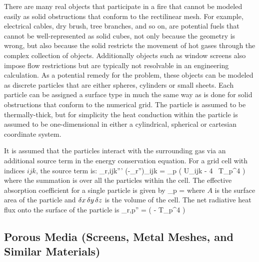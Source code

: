 There are many real objects that participate in a fire that cannot be modeled easily as solid obstructions that conform
to the rectilinear mesh. For example, electrical cables, dry brush, tree branches, and so on, are potential fuels that cannot
be well-represented as solid cubes, not only because the geometry is wrong, but also because the solid restricts the
movement of hot gases through the complex collection of objects.  Additionally objects such as window screens also impose flow restrictions but are typically not resolvable in an engineering calculation. As a potential remedy for the problem, these objects can
be modeled as discrete particles that are either spheres, cylinders or small sheets. Each particle can be assigned a surface
type in much the same way as is done for solid obstructions that conform to the numerical grid. The particle is assumed to be
thermally-thick, but for simplicity the heat conduction within the particle is assumed to be one-dimensional in either
a cylindrical, spherical or cartesian coordinate system.

It is assumed that the particles interact with the surrounding gas via an additional source term in the energy conservation
equation. For a grid cell with indices $ijk$, the source term is:
\be \dq_{{\rm r},ijk}''' \equiv (-\nabla \cdot \dot{\bq}_{\rm r}'')_{ijk} = \sum \kappa_{\rm p} \left( U_{ijk} - 4 \sigma \, T_{\rm p}^4 \right) \ee
where the summation is over all the particles within the cell. The effective absorption coefficient for a single particle is given by
\be \kappa_{\rm p} =  \ee
where $A$ is the surface area of the particle and $\delta x \, \delta y \, \delta z$ is the volume of the cell.
The net radiative heat flux onto the surface of the particle is
\be \dq_{\rm r,p}'' = \epsilon \left(  - \sigma T_{\rm p}^4 \right) \ee

\subsection{Porous Media (Screens, Metal Meshes, and Similar Materials)}

